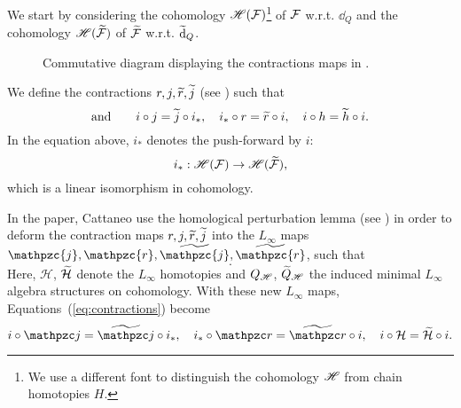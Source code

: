 We start by considering the cohomology $\mathscr{H}(\mathcal{F})$\footnote{We use a different font to distinguish the cohomology $\mathscr{H}$ from chain homotopies $H$.}
of $\mathcal{F}$ w.r.t. $\dd_Q$ and the cohomology $\mathscr{H}(\widetilde{\mathcal{F}})$ of $\widetilde{\mathcal{F}}$ w.r.t. $\widetilde{\dd}_Q$.
\begin{figure}
    \centering
    
    \caption{Commutative diagram displaying the contractions maps in .}
    \label{fig:contractions_diagram}
\end{figure}
We define the contractions $r, j, \widetilde{r}, \widetilde{j}$ (see ) such that
\begin{equation}
    
\end{equation}
\begin{equation}
\label{eq:contractions}
    \text{and} \qquad
    i \circ j = \widetilde{j} \circ i_*, \quad
    i_* \circ r = \widetilde{r} \circ i, \quad
    i \circ h = \widetilde{h} \circ i .
\end{equation}
In the equation above, $i_*$ denotes the push-forward by $i$:
\begin{equation*}
    i_* : \mathscr{H}(\mathcal{F}) \rightarrow \mathscr{H}(\widetilde{\mathcal{F}}) ,
\end{equation*}
which is a linear isomorphism in cohomology.

In the paper, Cattaneo \etal use the homological perturbation lemma (see \cite[Section 6.4]{Hom_mirror_trasnfer_lemma}) in order to deform the contraction maps $r, j, \widetilde{r}, \widetilde{j}$ into the $L_\infty$ maps $\mathpzc{j}, \mathpzc{r}, \wt{\mathpzc{j}}, \wt{\mathpzc{r}}$, such that
\begin{equation}
     .
\end{equation}
Here, $\mathcal{H}$, $\widetilde{\mathcal{H}}$ denote the $L_\infty$ homotopies and $Q_{\mathscr{H}}$, $\widetilde{Q}_{\mathscr{H}}$ the induced minimal $L_\infty$ algebra structures on cohomology.
With these new $L_\infty$ maps, Equations~(\ref{eq:contractions}) become
\begin{equation}
    i \circ \cazz{j} = \wt{\cazz{j}} \circ i_*, \quad
    i_* \circ \cazz{r} = \wt{\cazz{r}} \circ i, \quad
    i \circ \mc{H} = \wt{\mc{H}} \circ i .
\end{equation}

